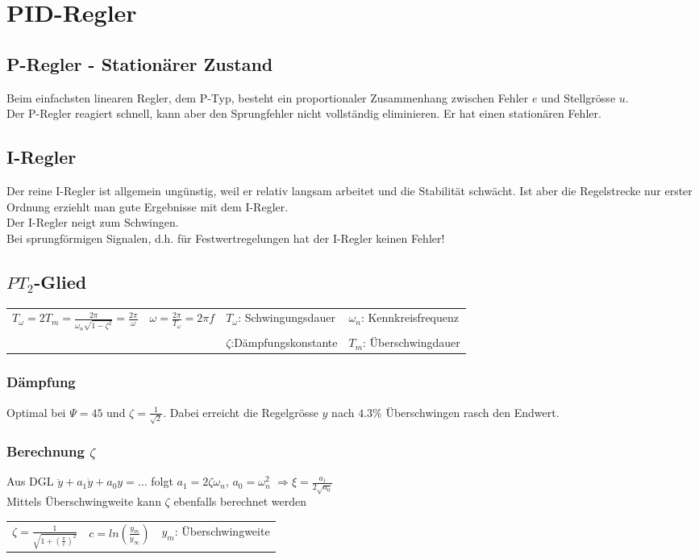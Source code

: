 \section{PID-Regler }

	\subsection{P-Regler - Stationärer Zustand }
		Beim einfachsten linearen Regler, dem P-Typ, besteht ein proportionaler
		Zusammenhang zwischen Fehler $e$ und Stellgrösse $u$.\\
		Der P-Regler reagiert schnell, kann aber den Sprungfehler nicht vollständig
		eliminieren. Er hat einen stationären Fehler.
		
	
	\subsection{I-Regler }
		Der reine I-Regler ist allgemein ungünstig, weil er relativ langsam arbeitet
		und die Stabilität schwächt. Ist aber die Regelstrecke nur erster Ordnung
		erziehlt man gute Ergebnisse mit dem I-Regler.\\
		Der I-Regler neigt zum Schwingen.\\
		Bei sprungförmigen Signalen, d.h. für Festwertregelungen hat der I-Regler
		keinen Fehler!
		
	
	\subsection{$PT_2$-Glied }
		\begin{tabular}{p{5cm}p{3cm}p{4cm}p{4cm}}
			$T_\omega = 2T_m=\frac{2\pi}{\omega_n \sqrt{1-\zeta^2}}=\frac{2\pi}{\omega}$ & $\omega = \frac{2\pi}{T_\omega}=2\pi f$ &  $T_\omega$: Schwingungsdauer & $\omega_n$: Kennkreisfrequenz\\
			& & $\zeta$:Dämpfungskonstante & $T_m$: Überschwingdauer
		\end{tabular}

		\subsubsection{Dämpfung}
		Optimal bei $\Psi=45$ und $\zeta=\frac{1}{\sqrt{2}}$.
		Dabei erreicht die Regelgrösse $y$ nach $4.3\%$ Überschwingen rasch den	Endwert.
		\subsubsection{Berechnung $\zeta$}
		Aus DGL $\ddot{y}+a_1\dot{y}+a_0 y=\ldots$ folgt $a_1=2\zeta\omega_n$, $a_0=\omega_n^2$ $\Rightarrow \xi=\frac{a_1}{2\sqrt{a_0}}$ \\
		Mittels Überschwingweite kann $\zeta$ ebenfalls berechnet werden\\
		\begin{tabular}{p{3cm}p{3cm}p{6cm}}
			$\zeta = \frac{1}{\sqrt{1+(\frac{\pi}{c})^2}}$ & $c =ln(\frac{y_m}{y_{\infty}})$ & $y_m$: Überschwingweite
		\end{tabular}

